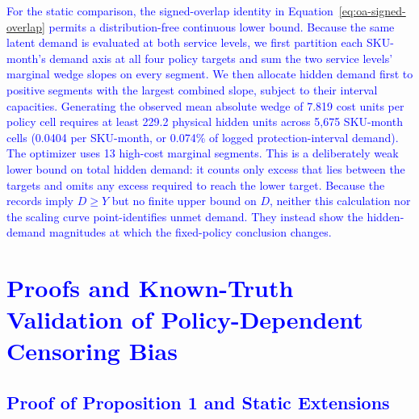 \documentclass[msom,dblanonrev]{informs4}
\newcommand{\add}[1]{\textcolor{blue}{#1}}
\begin{document}
\add{For the static comparison, the signed-overlap identity in Equation~\eqref{eq:oa-signed-overlap} permits a distribution-free continuous lower bound. Because the same latent demand is evaluated at both service levels, we first partition each SKU-month's demand axis at all four policy targets and sum the two service levels' marginal wedge slopes on every segment. We then allocate hidden demand first to positive segments with the largest combined slope, subject to their interval capacities. Generating the observed mean absolute wedge of 7.819 cost units per policy cell requires at least 229.2 physical hidden units across 5{,}675 SKU-month cells (0.0404 per SKU-month, or 0.074\% of logged protection-interval demand). The optimizer uses 13 high-cost marginal segments. This is a deliberately weak lower bound on total hidden demand: it counts only excess that lies between the targets and omits any excess required to reach the lower target. Because the records imply $D\geq Y$ but no finite upper bound on $D$, neither this calculation nor the scaling curve point-identifies unmet demand. They instead show the hidden-demand magnitudes at which the fixed-policy conclusion changes.}

\section{\add{Proofs and Known-Truth Validation of Policy-Dependent Censoring Bias}}\label{oa:known-truth}

\subsection{\add{Proof of Proposition 1 and Static Extensions}}
\end{document}
